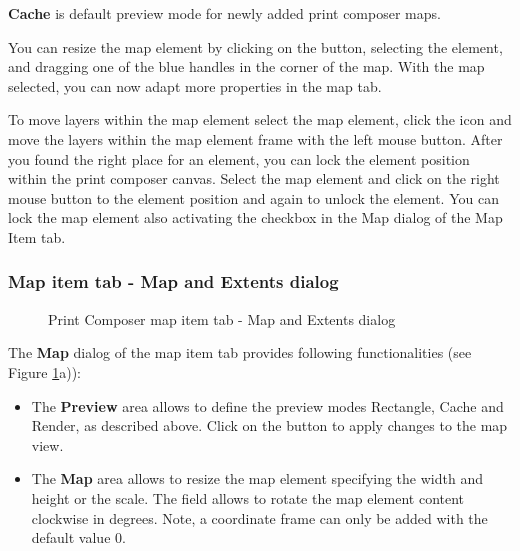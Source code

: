 \textbf{Cache} is default preview mode for newly added print composer maps.

You can resize the map element by clicking on the
 button, selecting the
element, and dragging one of the blue handles in the corner of the map. With
the map selected, you can now adapt more properties in the map 
tab.

To move layers within the map element select the map element, click
the  icon
and move the layers within the map element frame with the left mouse button.
After you found the right place for an element, you can lock the element
position within the print composer canvas. Select the map element and click
on the right mouse button to  the element
position and again to unlock the element. You can lock the map element also
activating the  checkbox in the Map dialog
of the Map Item tab. 

\subsubsection{Map item tab - Map and Extents dialog}

\begin{figure}[ht]
\centering
\caption{Print Composer map item tab - Map and Extents dialog \nixcaption}\label{fig:mapdialog} 
\goodgap
{}
\end{figure}


The \textbf{Map} dialog of the map item tab provides following functionalities
(see Figure \ref{fig:mapdialog}a)):
 
\begin{itemize}
\item The \textbf{Preview} area allows to define the preview modes Rectangle,
Cache and Render, as described above. Click on the 
button to apply changes to the map view.
\item The \textbf{Map} area allows to resize the map element specifying the
width and height or the scale. The  field allows to
rotate the map element content clockwise in degrees. Note, a coordinate frame
can only be added with the default value 0.  
\end{itemize}


